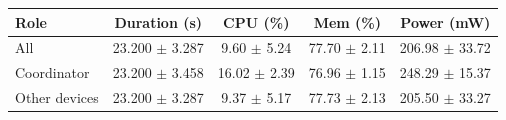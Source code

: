 \begin{tabular}{lcccc}
\hline
\textbf{Role} & \textbf{Duration (s)} & \textbf{CPU (\%)} & \textbf{Mem (\%)} & \textbf{Power (mW)} \\
\hline
All & 23.200 $\pm$ 3.287 & 9.60 $\pm$ 5.24 & 77.70 $\pm$ 2.11 & 206.98 $\pm$ 33.72 \\
Coordinator & 23.200 $\pm$ 3.458 & 16.02 $\pm$ 2.39 & 76.96 $\pm$ 1.15 & 248.29 $\pm$ 15.37 \\
Other devices & 23.200 $\pm$ 3.287 & 9.37 $\pm$ 5.17 & 77.73 $\pm$ 2.13 & 205.50 $\pm$ 33.27 \\
\hline
\end{tabular}
